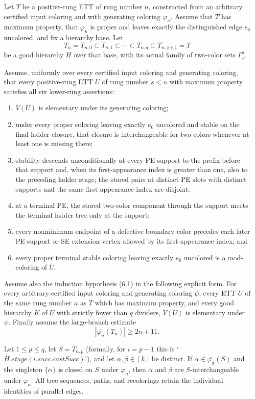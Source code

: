 \begin{lemma}
Let $T$ be a positive-rung ETT of rung number $n$, constructed from an
arbitrary certified input coloring and with generating coloring
$\varphi_n$.  Assume that $T$ has maximum property, that $\varphi_n$ is
proper and leaves exactly the distinguished edge $e_0$ uncolored, and
fix a hierarchy base.  Let
\[
 T_n=T_{n,0}\subset T_{n,1}\subset\cdots\subset
 T_{n,q}\subset T_{n,q+1}=T
\]
be a good hierarchy $H$ over that base, with its actual family of
two-color sets $\Gamma^j_\eta$.

Assume, uniformly over every certified input coloring and generating
coloring, that every positive-rung ETT $U$ of rung number $s<n$ with
maximum property satisfies all six lower-rung assertions:
\begin{enumerate}
\item $V(U)$ is elementary under its generating coloring;
\item under every proper coloring leaving exactly $e_0$ uncolored and
stable on the final ladder closure, that closure is interchangeable for
two colors whenever at least one is missing there;
\item stability descends unconditionally at every PE support to the prefix before
that support and, when its first-appearance index is greater than one, also
to the preceding ladder stage; the stored pairs at
distinct PE slots with distinct supports and the same first-appearance
index are disjoint;
\item at a terminal PE, the stored two-color component through the
support meets the terminal ladder tree only at the support;
\item every nonminimum endpoint of a defective boundary color precedes
each later PE support or SE extension vertex allowed by its
first-appearance index; and
\item every proper terminal stable coloring leaving exactly $e_0$
uncolored is a mod-coloring of $U$.
\end{enumerate}

Assume also the induction hypothesis (6.1) in the following explicit
form.  For every arbitrary certified input coloring and generating
coloring $\psi$, every ETT $U$ of the same rung number $n$ as $T$ which
has maximum property, and every good hierarchy $K$ of $U$ with strictly
fewer than $q$ dividers, $V(U)$ is elementary under $\psi$.  Finally
assume the large-branch estimate
\[
              |\overline{\varphi_n}(T_n)|\geq 2n+11.       \tag{L}
\]

Let $1\leq p\leq q$, let
$S=T_{n,p}$ (formally, for $i=p-1$ this is
`$H.\mathit{stage}(i.\mathit{succ}.\mathit{castSucc})$'), and let
$\alpha,\beta\in[k]$ be distinct.  If
$\alpha\in\overline{\varphi_n}(S)$ and the singleton
$\{\alpha\}$ is closed on $S$ under $\varphi_n$, then $\alpha$ and
$\beta$ are $S$-interchangeable under $\varphi_n$.  All tree sequences,
paths, and recolorings retain the individual identities of parallel
edges.
\end{lemma}
